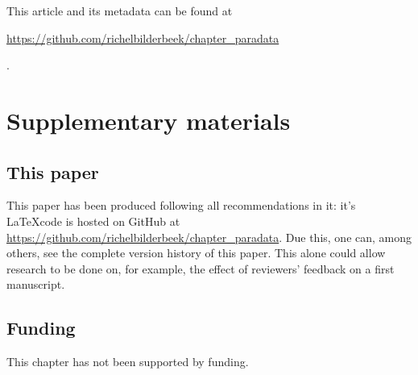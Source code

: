 This article and its metadata can be found at 
\begin{sloppypar}\url{https://github.com/richelbilderbeek/chapter_paradata}\end{sloppypar}.




\newpage
\appendix
\section{Supplementary materials}

\renewcommand{\thefigure}{S\arabic{figure}}
\setcounter{figure}{0}

\renewcommand{\thetable}{S\arabic{table}}
\setcounter{table}{0}

\subsection{This paper}

This paper has been produced following all recommendations in it:
it's \LaTeX code is hosted on GitHub 
at \url{https://github.com/richelbilderbeek/chapter_paradata}.
Due this, one can, among others, see the complete version history of this paper.
This alone could allow research to be done on, for example,
the effect of reviewers' feedback on a first manuscript.

\subsection{Funding}

This chapter has not been supported by funding.

